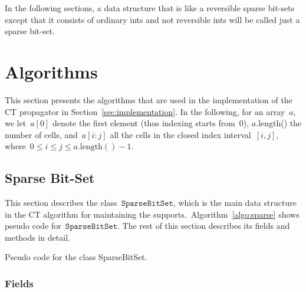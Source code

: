\documentclass[a4paper,11pt]{article}
\newcommand{\Chapref}[1]{Section~\ref{#1}}
\newcommand{\Algoref}[1]{Algorithm~\ref{#1}}
\newcommand{\SparseBitSet}{\texttt{SparseBitSet}}
\newcommand{\function}[1]{\mathrm{#1}}
\numberwithin{equation}{section}
\begin{document}
In the following sections, a data structure that is 
like a reversible sparse bit-sets except that it consists 
of ordinary ints and not reversible ints
will be called just a sparse bit-set.

\section{Algorithms}
\label{sec:algorithms}


This section presents the algorithms that are used in the implementation of the
CT propagator in \Chapref{sec:implementation}.
In the following, for an array~$a$, we let~$a[0]$ denote the first element
(thus indexing starts from~$0$),
$a$.length() the number of cells, and~$a[i:j]$ all the cells in the closed
index interval~$[i,j]$, where~$0 \leq i \leq j \leq a.\function{length}() - 1$.

\subsection{Sparse Bit-Set}
\label{sec:sbs}
This section describes the class~$\SparseBitSet$, which is the main data structure
in the CT algorithm for maintaining the supports.~\Algoref{algo:sparse} shows
pseudo code for~$\SparseBitSet$. The rest of this section describes its
fields and methods in detail.

\begin{algorithm}[H]
  \begin{algorithmic}[1]  %
    
    \end{algorithmic}
  \caption{Pseudo code for the class SparseBitSet.}
  \label{algo:sparse}
\end{algorithm}

\subsubsection{Fields}
\label{sbs:fields}
\end{document}
